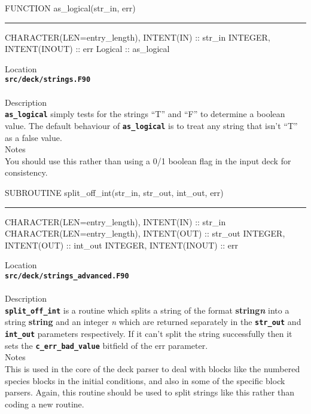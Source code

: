 \documentclass[12pt,a4paper]{article}
\newcommand{\HRule}{\rule[0.3cm]{\linewidth}{0.5mm}}
\newcommand{\inlinecode}[1]{{\color{warwickred} \bf\texttt{#1}}}
\begin{document}
\pagebreak
\begin{codedef}
FUNCTION as_logical(str_in, err)
\HRule
CHARACTER(LEN=entry_length), INTENT(IN) :: str_in
INTEGER, INTENT(INOUT) :: err
Logical :: as_logical
\end{codedef}
\vspace{1cm}
{\Large Location\\}
\inlinecode{src/deck/strings.F90}\\
\\[0.5cm]
{\Large Description\\}
\inlinecode{as\_logical} simply tests for the strings ``T'' and ``F'' to
determine a boolean value. The default behaviour of \inlinecode{as\_logical} is
to treat any string that isn't ``T'' as a false value.
\\[0.5cm]
{\Large Notes\\}
You should use this rather than using a 0/1 boolean flag in the input deck for
consistency.

\pagebreak
\begin{codedef}
SUBROUTINE split_off_int(str_in, str_out, int_out, err)
\HRule
CHARACTER(LEN=entry_length), INTENT(IN) :: str_in
CHARACTER(LEN=entry_length), INTENT(OUT) :: str_out
INTEGER, INTENT(OUT) :: int_out
INTEGER, INTENT(INOUT) :: err
\end{codedef}
\vspace{1cm}
{\Large Location\\}
\inlinecode{src/deck/strings\_advanced.F90}\\
\\[0.5cm]
{\Large Description\\}
\inlinecode{split\_off\_int} is a routine which splits a string of the format
{\bf string{\it n}} into a string {\bf string} and an integer {\it n} which are
returned separately in the \inlinecode{str\_out} and \inlinecode{int\_out}
parameters respectively.  If it can't split the string successfully then it
sets the \inlinecode{c\_err\_bad\_value} bitfield of the err parameter.
\\[0.5cm]
{\Large Notes\\}
This is used in the core of the deck parser to deal with blocks like the
numbered species blocks in the initial conditions, and also in some of the
specific block parsers. Again, this routine should be used to split strings
like this rather than coding a new routine.
\end{document}
